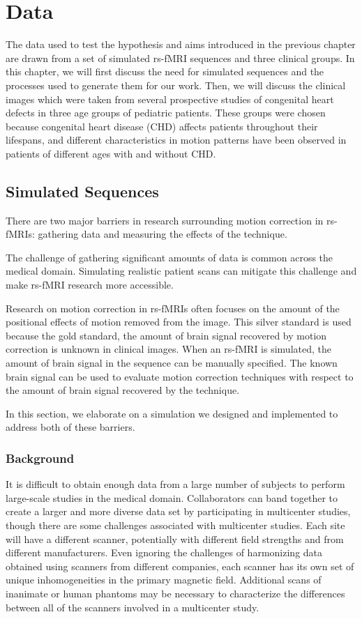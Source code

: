 \chapter{Data}
\label{ch:data}

The data used to test the hypothesis and aims introduced in the previous chapter are drawn from a set of simulated rs-fMRI sequences and three clinical groups. In this chapter, we will first discuss the need for simulated sequences and the processes used to generate them for our work. Then, we will discuss the clinical images which were taken from several prospective studies of congenital heart defects in three age groups of pediatric patients. These groups were chosen because congenital heart disease (CHD) affects patients throughout their lifespans, and different characteristics in motion patterns have been observed in patients of different ages with and without CHD.

\section{Simulated Sequences} 

There are two major barriers in research surrounding motion correction in rs-fMRIs: gathering data and measuring the effects of the technique. 

The challenge of gathering significant amounts of data is common across the medical domain. Simulating realistic patient scans can mitigate this challenge and make rs-fMRI research more accessible. 

Research on motion correction in rs-fMRIs often focuses on the amount of the positional effects of motion removed from the image. This silver standard is used because the gold standard, the amount of brain signal recovered by motion correction is unknown in clinical images. When an rs-fMRI is simulated, the amount of brain signal in the sequence can be manually specified. The known brain signal can be used to evaluate motion correction techniques with respect to the amount of brain signal recovered by the technique.

In this section, we elaborate on a simulation we designed and implemented to address both of these barriers.

\subsection{Background}

It is difficult to obtain enough data from a large number of subjects to perform large-scale studies in the medical domain. Collaborators can band together to create a larger and more diverse data set by participating in multicenter studies, though there are some challenges associated with multicenter studies. Each site will have a different scanner, potentially with different field strengths and from different manufacturers. Even ignoring the challenges of harmonizing data obtained using scanners from different companies, each scanner has its own set of unique inhomogeneities in the primary magnetic field. Additional scans of inanimate or human phantoms may be necessary to characterize the differences between all of the scanners involved in a multicenter study.

